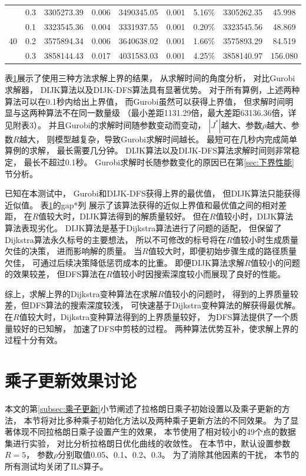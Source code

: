 \begin{table}[hbt]
\begin{tabular}{crccccccc}
									& 0.3   & 3305273.39 & 0.006 & 3490345.05 & 0.001 & 5.16\% & 3305262.35 & 45.998 \\
	  		\multirow{3}[0]{*}{40} 	& 0.1   & 3323545.36 & 0.004 & 3331937.55 & 0.001 & 0.20\% & 3323545.56 & 48.869 \\
									& 0.2   & 3575894.34 & 0.006 & 3640638.02 & 0.001 & 1.66\% & 3575893.29 & 84.519 \\
									& 0.3   & 3858144.43 & 0.017 & 4031583.03 & 0.001 & 4.25\% & 3858140.97 & 156.080 \\
			\bottomrule
		\end{tabular}%
 	\vspace{-2ex}
	\label{table:上界性能}
\end{table}%


表\ref{table:上界性能}展示了使用三种方法求解上界的结果，
从求解时间的角度分析，
对比Gurobi求解器，
DIJK算法以及DIJK-DFS算法具有显著优势。
对于所有算例，上述两种算法可以在0.1秒内给出上界值，
而Gurobi虽然可以获得上界值，
但求解时间明显与这两种算法不在同一数量级
（最小差距1131.29倍，最大差距63136.36倍，详见附表3）。
并且Gurobi的求解时间随参数变动而变动，
$|J^*|$越大、参数$\rho$越大、参数$R$越大，
则模型越复杂，导致Gurobi求解时间越长。
最短可在几秒内完成简单算例的求解，
最长需要几分钟。
DIJK算法以及DIJK-DFS算法求解时间则非常稳定，
最长不超过0.1秒。
Gurobi求解时长随参数变化的原因已在第\ref{sec:下界性能}节分析。

已知在本测试中，
Gurobi和DIJK-DFS获得上界的最优值，
但DIJK算法只能获得近似值。
表\ref{table:上界性能}的gap*列
展示了该算法获得的近似上界值和最优值之间的相对差距，
在$R$值较大时，DIJK算法得到的解质量较好。
但在$R$值较小时，DIJK算法算法表现劣化。
DIJK算法是基于Dijkstra算法进行了问题的适配，
但保留了Dijkstra算法永久标号的主要想法，
所以不可修改的标号将在$R$值较小时生成质量欠佳的决策，
进而影响解的质量。
当$R$值较大时，即便初始步骤生成的路径质量欠佳，
可通过后续决策降低惩罚成本的比重。
即便DIJK算法求解$R$值较小的问题的效果较差，
但DFS算法在$R$值较小时因搜索深度较小而展现了良好的性能。

综上，求解上界的Dijkstra变种算法在求解$R$值较小的问题时，
得到的上界质量较差，但DFS算法的搜索深度较浅，
可快速基于Dijkstra变种算法的解获得最优解。
在$R$值较大时，Dijkstra变种算法得到的上界质量较好，
为DFS算法提供了一个质量较好的已知解，
加速了DFS中剪枝的过程。
两种算法优势互补，使求解上界的过程十分有效。


\section{乘子更新效果讨论}
\label{sec:乘子性能}
本文的第\ref{subsec:乘子更新}小节阐述了拉格朗日乘子初始设置以及乘子更新的方法，
本节将对比多种乘子初始化方法以及两种乘子更新方法的不同效果。
为了显著体现不同拉格朗日乘子设置产生的效果，
本节使用了相对较小的49个点的数据集进行实验，
对比分析拉格朗日优化曲线的收敛性。
在本节中，默认设置参数$R=5$，
参数$\rho$分别取值0.05、0.1、0.2、0.3。
为了消除其他因素的干扰，
本节的所有测试均关闭了ILS算子。

